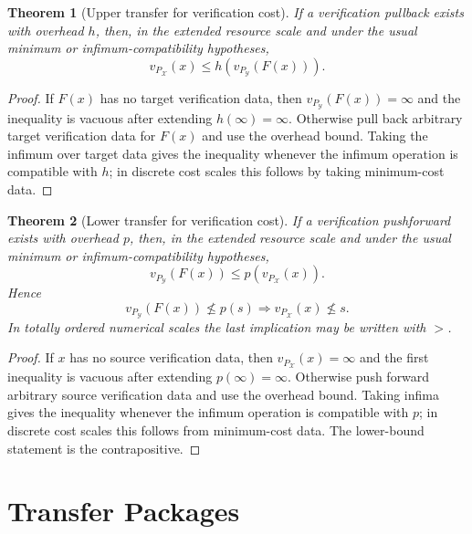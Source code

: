 \documentclass[11pt]{article}
\newtheorem{theorem}{Theorem}[section]
\begin{document}
\begin{theorem}[Upper transfer for verification cost]
If a verification pullback exists with overhead \(h\), then, in the extended resource scale and under the usual minimum or infimum-compatibility hypotheses,
\[
v_{P_\mathcal X}(x)
\leq
h(v_{P_\mathcal Y}(F(x))).
\]
\end{theorem}

\begin{proof}
If \(F(x)\) has no target verification data, then \(v_{P_\mathcal Y}(F(x))=\infty\) and the inequality is vacuous after extending \(h(\infty)=\infty\). Otherwise pull back arbitrary target verification data for \(F(x)\) and use the overhead bound. Taking the infimum over target data gives the inequality whenever the infimum operation is compatible with \(h\); in discrete cost scales this follows by taking minimum-cost data.
\end{proof}

\begin{theorem}[Lower transfer for verification cost]
If a verification pushforward exists with overhead \(p\), then, in the extended resource scale and under the usual minimum or infimum-compatibility hypotheses,
\[
v_{P_\mathcal Y}(F(x))
\leq
p(v_{P_\mathcal X}(x)).
\]
Hence
\[
v_{P_\mathcal Y}(F(x))\nleq p(s)
\Longrightarrow
v_{P_\mathcal X}(x)\nleq s.
\]
In totally ordered numerical scales the last implication may be written with \(>\).
\end{theorem}

\begin{proof}
If \(x\) has no source verification data, then \(v_{P_\mathcal X}(x)=\infty\) and the first inequality is vacuous after extending \(p(\infty)=\infty\). Otherwise push forward arbitrary source verification data and use the overhead bound. Taking infima gives the inequality whenever the infimum operation is compatible with \(p\); in discrete cost scales this follows from minimum-cost data. The lower-bound statement is the contrapositive.
\end{proof}

\section{Transfer Packages}
\end{document}
